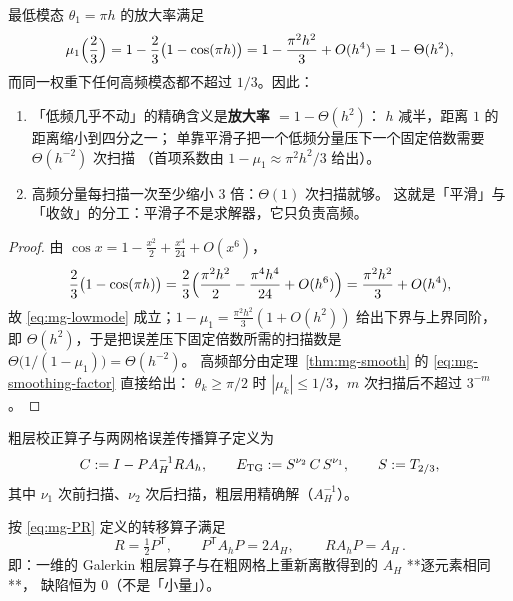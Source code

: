\begin{corollary}
\label{cor:mg-lowmode}
最低模态 $\theta_1=\pi h$ 的放大率满足
\begin{equation}
  \mu_1\Bigl(\frac23\Bigr)=1-\frac23\bigl(1-\cos(\pi h)\bigr)
  =1-\frac{\pi^2h^2}{3}+O(h^4)
  =1-\Theta(h^2),
  \label{eq:mg-lowmode}
\end{equation}
而同一权重下任何高频模态都不超过 $1/3$。因此：
\begin{enumerate}
  \item 「低频几乎不动」的精确含义是\textbf{放大率 $=1-\Theta(h^2)$}：
        $h$ 减半，距离 $1$ 的距离缩小到四分之一；
        单靠平滑子把一个低频分量压下一个固定倍数需要 $\Theta(h^{-2})$ 次扫描
        （首项系数由 $1-\mu_1\approx\pi^2h^2/3$ 给出）。
  \item 高频分量每扫描一次至少缩小 $3$ 倍：$\Theta(1)$ 次扫描就够。
        这就是「平滑」与「收敛」的分工：平滑子不是求解器，它只负责高频。
\end{enumerate}
\end{corollary}

\begin{proof}
由 $\cos x=1-\frac{x^2}{2}+\frac{x^4}{24}+O(x^6)$，
\begin{equation}
  \frac23\bigl(1-\cos(\pi h)\bigr)
  =\frac23\Bigl(\frac{\pi^2h^2}{2}-\frac{\pi^4h^4}{24}+O(h^6)\Bigr)
  =\frac{\pi^2h^2}{3}+O(h^4),
\end{equation}
故 \eqref{eq:mg-lowmode} 成立；$1-\mu_1=\frac{\pi^2h^2}{3}(1+O(h^2))$ 给出下界与上界同阶，
即 $\Theta(h^2)$，于是把误差压下固定倍数所需的扫描数是
$\Theta\bigl(1/(1-\mu_1)\bigr)=\Theta(h^{-2})$。
高频部分由定理~\ref{thm:mg-smooth} 的 \eqref{eq:mg-smoothing-factor} 直接给出：
$\theta_k\ge\pi/2$ 时 $|\mu_k|\le1/3$，$m$ 次扫描后不超过 $3^{-m}$。
\end{proof}

\begin{definition}[两个网格算子]
\label{def:mg-tg}
粗层校正算子与两网格误差传播算子定义为
\begin{equation}
  C:=I-PA_H^{-1}RA_h,\qquad
  E_{\rm TG}:=S^{\nu_2}\,C\,S^{\nu_1},\qquad S:=T_{2/3},
  \label{eq:mg-tg}
\end{equation}
其中 $\nu_1$ 次前扫描、$\nu_2$ 次后扫描，粗层用精确解（$A_H^{-1}$）。
\end{definition}

\begin{theorem}[$R=\frac12P^{\mathsf T}$ 与一维 Galerkin 恒等式]
\label{thm:mg-galerkin}
按 \eqref{eq:mg-PR} 定义的转移算子满足
\begin{equation}
  R=\tfrac12P^{\mathsf T},
  \qquad
  P^{\mathsf T}A_hP=2A_H,
  \qquad
  \boxed{\,RA_hP=A_H\,}.
  \label{eq:mg-galerkin}
\end{equation}
即：一维的 Galerkin 粗层算子与在粗网格上重新离散得到的 $A_H$ **逐元素相同**，
缺陷恒为 $0$（不是「小量」）。
\end{theorem}


